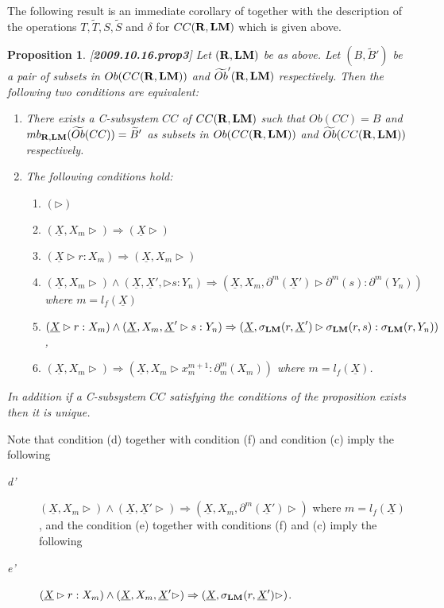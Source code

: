 \documentclass[11pt]{article}
\newtheorem{proposition}{Proposition}[subsection]
\newcommand{\llabel}[1]{\label{#1}[{\bf #1}]}
\newcommand{\rr}{{\bf R}}
\newcommand{\lm}{{\bf LM}}
\newcommand{\uu}{\underline}
\newcommand{\wt}{\widetilde}
\begin{document}
The following result is an immediate corollary of \cite[Proposition 4.3]{Csubsystems} together with the description of the operations $T,\wt{T},S,\wt{S}$ and $\delta$ for $CC(\rr,\lm)$ which is given above. 
%
\begin{proposition}
\llabel{2009.10.16.prop3}
Let $(\rr,\lm)$ be as above. Let $(B,\wt{B}')$ be a pair of subsets in $Ob(CC(\rr,\lm))$ and $\wt{Ob}'(\rr,\lm)$ respectively. Then the following two conditions are equivalent:
%
\begin{enumerate}
\item There exists a C-subsystem $CC$ of $CC(\rr,\lm)$ such that $Ob(CC)=B$ and $mb_{\rr,\lm}(\wt{Ob}(CC))=\wt{B}'$ as subsets in $Ob(CC(\rr,\lm))$ and $\wt{Ob}(CC(\rr,\lm))$ respectively.
\item The following conditions hold:
%
\begin{enumerate}
\item $(\rhd)$
\item $(\uu{X}, X_m\rhd)\Rightarrow (\uu{X}\rhd)$
\item $(\uu{X}\rhd r:X_m)\Rightarrow (\uu{X},X_m\rhd)$
\item $(\uu{X}, X_m\rhd)\wedge(\uu{X},\uu{X}',\rhd s:Y_n)\Rightarrow  (\uu{X}, X_m, \partial^{m}(\uu{X}')\rhd \partial^{m} (s): \partial^{m}(Y_n))$
where $m=l_f(\uu{X})$
\item  $(\uu{X}\rhd  r:X_m)\wedge (\uu{X},X_m,\uu{X}'\rhd s:Y_n)\Rightarrow (\uu{X}, \sigma_{\lm}(r,\uu{X}') \rhd \sigma_{\lm}(r,s) : \sigma_{\lm}(r,Y_n))$ ,
%
\item $(\uu{X},X_m\rhd)\Rightarrow (\uu{X},X_m\rhd x_{m}^{m+1}:\partial_m^m(X_m))$ where $m=l_f(\uu{X})$.
\end{enumerate}
\end{enumerate}
%
In addition if a C-subsystem $CC$ satisfying the conditions of the proposition exists then it is unique.  
%
\end{proposition}
%
Note that condition (d) together with condition (f) and condition (c) imply the following 
%
\begin{description}
\item[{\em d'}] $(\uu{X}, X_m\rhd)\wedge (\uu{X},\uu{X}'\rhd)\Rightarrow (\uu{X}, X_m, \partial^m(\uu{X}')\rhd)$ where $m=l_f(\uu{X})$,
%
and the condition (e) together with conditions (f) and (c) imply the following 
%
\item[{\em e'}] $(\uu{X}\rhd  r:X_m)\wedge (\uu{X},X_m,\uu{X}'\rhd)\Rightarrow (\uu{X}, \sigma_{\lm}(r,\uu{X}')\rhd)$.
%
\end{description}
\end{document}
